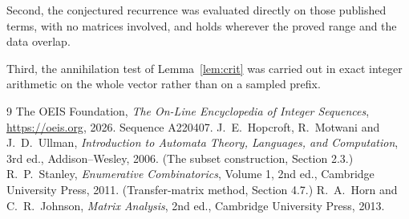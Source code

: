 \documentclass[11pt,a4paper]{article}
\theoremstyle{plain}
\theoremstyle{definition}
\begin{document}
Second, the conjectured recurrence was evaluated directly on those published terms, with no
matrices involved, and holds wherever the proved range and the data overlap.

Third, the annihilation test of Lemma~\ref{lem:crit} was carried out in exact integer
arithmetic on the whole vector rather than on a sampled prefix.

\begin{thebibliography}{9}
 The OEIS Foundation, \emph{The On-Line Encyclopedia of Integer
Sequences}, \url{https://oeis.org}, 2026. Sequence A220407.
 J.~E.~Hopcroft, R.~Motwani and J.~D.~Ullman, \emph{Introduction to Automata
Theory, Languages, and Computation}, 3rd ed., Addison--Wesley, 2006. (The subset
construction, Section 2.3.)
 R.~P.~Stanley, \emph{Enumerative Combinatorics}, Volume 1, 2nd ed.,
Cambridge University Press, 2011. (Transfer-matrix method, Section 4.7.)
 R.~A.~Horn and C.~R.~Johnson, \emph{Matrix Analysis}, 2nd ed., Cambridge
University Press, 2013.
\end{thebibliography}
\end{document}
